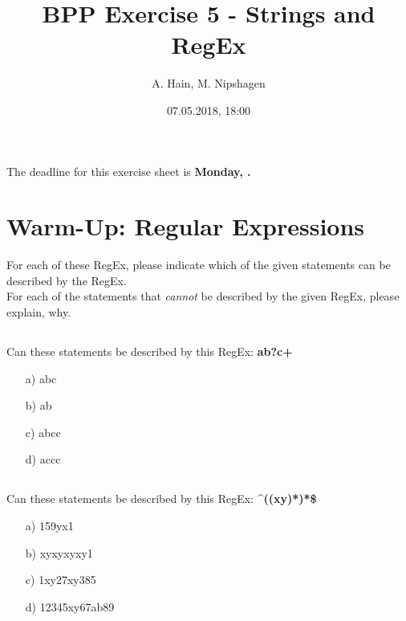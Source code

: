 
\usepackage{tikz}
\usetikzlibrary{arrows,automata}

\title{BPP Exercise 5 - Strings and RegEx}
\author{A. Hain, M. Nipshagen}
\date{07.05.2018, 18:00}

\makeatletter
\let\thetitle\@title
\let\theauthor\@author
\let\thedate\@date
\makeatother





The deadline for this exercise sheet is \textbf{Monday, \thedate.}
%
%

\section{Warm-Up: Regular Expressions}
For each of these RegEx, please indicate which of the given statements can be described by the RegEx.\\
For each of the statements that \textit{cannot} be described by the given RegEx, please explain, why.

\subsection{}
Can these statements be described by this RegEx: \textbf{ab?c+}
\begin{itemize}
\item[a)] abc 
\item[b)] ab 
\item[c)] abcc 
\item[d)] accc 
\end{itemize}

\subsection{}
Can these statements be described by this RegEx: \textbf{\string^((xy)\textbar[0-9]*)*\$}
\begin{itemize}
\item[a)] 159yx1 
\item[b)] xyxyxyxy1 
\item[c)] 1xy27xy385 
\item[d)] 12345xy67ab89 
\end{itemize}

